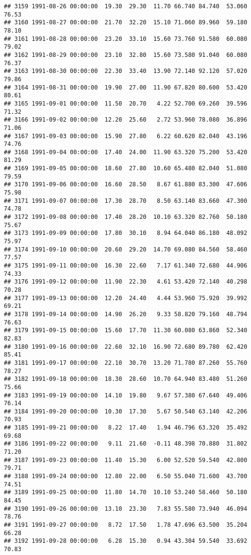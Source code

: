\documentclass{article}\usepackage{graphicx, color}
\makeatletter
\newenvironment{kframe}{%
 \def\at@end@of@kframe{}%
 \ifinner\ifhmode%
  \def\at@end@of@kframe{\end{minipage}}%
  \begin{minipage}{\columnwidth}%
 \fi\fi%
 \def\FrameCommand##1{\hskip\@totalleftmargin \hskip-\fboxsep
 \colorbox{shadecolor}{##1}\hskip-\fboxsep
     \hskip-\linewidth \hskip-\@totalleftmargin \hskip\columnwidth}%
 \MakeFramed {\advance\hsize-\width
   \@totalleftmargin\z@ \linewidth\hsize
   \@setminipage}}%
 {\par\unskip\endMakeFramed%
 \at@end@of@kframe}
\newenvironment{knitrout}{}{} %
\makeatother
\begin{document}
\begin{knitrout}
\begin{kframe}
\begin{verbatim}
## 3159 1991-08-26 00:00:00  19.30  29.30  11.70 66.740 84.740  53.060  76.53
## 3160 1991-08-27 00:00:00  21.70  32.20  15.10 71.060 89.960  59.180  78.10
## 3161 1991-08-28 00:00:00  23.20  33.10  15.60 73.760 91.580  60.080  79.02
## 3162 1991-08-29 00:00:00  23.10  32.80  15.60 73.580 91.040  60.080  76.37
## 3163 1991-08-30 00:00:00  22.30  33.40  13.90 72.140 92.120  57.020  79.86
## 3164 1991-08-31 00:00:00  19.90  27.00  11.90 67.820 80.600  53.420  80.61
## 3165 1991-09-01 00:00:00  11.50  20.70   4.22 52.700 69.260  39.596  71.32
## 3166 1991-09-02 00:00:00  12.20  25.60   2.72 53.960 78.080  36.896  71.06
## 3167 1991-09-03 00:00:00  15.90  27.80   6.22 60.620 82.040  43.196  74.76
## 3168 1991-09-04 00:00:00  17.40  24.00  11.90 63.320 75.200  53.420  81.29
## 3169 1991-09-05 00:00:00  18.60  27.80  10.60 65.480 82.040  51.080  79.59
## 3170 1991-09-06 00:00:00  16.60  28.50   8.67 61.880 83.300  47.606  75.98
## 3171 1991-09-07 00:00:00  17.30  28.70   8.50 63.140 83.660  47.300  74.78
## 3172 1991-09-08 00:00:00  17.40  28.20  10.10 63.320 82.760  50.180  75.67
## 3173 1991-09-09 00:00:00  17.80  30.10   8.94 64.040 86.180  48.092  75.97
## 3174 1991-09-10 00:00:00  20.60  29.20  14.70 69.080 84.560  58.460  77.57
## 3175 1991-09-11 00:00:00  16.30  22.60   7.17 61.340 72.680  44.906  74.33
## 3176 1991-09-12 00:00:00  11.90  22.30   4.61 53.420 72.140  40.298  70.28
## 3177 1991-09-13 00:00:00  12.20  24.40   4.44 53.960 75.920  39.992  69.21
## 3178 1991-09-14 00:00:00  14.90  26.20   9.33 58.820 79.160  48.794  76.63
## 3179 1991-09-15 00:00:00  15.60  17.70  11.30 60.080 63.860  52.340  82.83
## 3180 1991-09-16 00:00:00  22.60  32.10  16.90 72.680 89.780  62.420  85.41
## 3181 1991-09-17 00:00:00  22.10  30.70  13.20 71.780 87.260  55.760  78.27
## 3182 1991-09-18 00:00:00  18.30  28.60  10.70 64.940 83.480  51.260  75.66
## 3183 1991-09-19 00:00:00  14.10  19.80   9.67 57.380 67.640  49.406  76.14
## 3184 1991-09-20 00:00:00  10.30  17.30   5.67 50.540 63.140  42.206  70.93
## 3185 1991-09-21 00:00:00   8.22  17.40   1.94 46.796 63.320  35.492  69.68
## 3186 1991-09-22 00:00:00   9.11  21.60  -0.11 48.398 70.880  31.802  71.20
## 3187 1991-09-23 00:00:00  11.40  15.30   6.00 52.520 59.540  42.800  79.71
## 3188 1991-09-24 00:00:00  12.80  22.00   6.50 55.040 71.600  43.700  74.51
## 3189 1991-09-25 00:00:00  11.80  14.70  10.10 53.240 58.460  50.180  84.45
## 3190 1991-09-26 00:00:00  13.10  23.30   7.83 55.580 73.940  46.094  78.76
## 3191 1991-09-27 00:00:00   8.72  17.50   1.78 47.696 63.500  35.204  66.28
## 3192 1991-09-28 00:00:00   6.28  15.30   0.94 43.304 59.540  33.692  70.83

\end{verbatim}
\end{kframe}
\end{knitrout}
\end{document}
